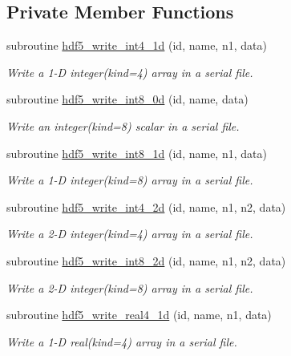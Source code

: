 \subsection*{Private Member Functions}
\begin{DoxyCompactItemize}
\item 
subroutine \hyperlink{classmodhdf5_a85487dfda18b03bd8b48100b016240b3}{hdf5\-\_\-write\-\_\-int4\-\_\-1d} (id, name, n1, data)
\begin{DoxyCompactList}\small\item\em Write a 1-\/\-D integer(kind=4) array in a serial file. \end{DoxyCompactList}\item 
subroutine \hyperlink{classmodhdf5_ac1a8b8e5ce7ef658ba72dab5853a855a}{hdf5\-\_\-write\-\_\-int8\-\_\-0d} (id, name, data)
\begin{DoxyCompactList}\small\item\em Write an integer(kind=8) scalar in a serial file. \end{DoxyCompactList}\item 
subroutine \hyperlink{classmodhdf5_af39615b3539b84afc3890884aafec217}{hdf5\-\_\-write\-\_\-int8\-\_\-1d} (id, name, n1, data)
\begin{DoxyCompactList}\small\item\em Write a 1-\/\-D integer(kind=8) array in a serial file. \end{DoxyCompactList}\item 
subroutine \hyperlink{classmodhdf5_ab39fa5690f5f029a8beea46dd8030b1d}{hdf5\-\_\-write\-\_\-int4\-\_\-2d} (id, name, n1, n2, data)
\begin{DoxyCompactList}\small\item\em Write a 2-\/\-D integer(kind=4) array in a serial file. \end{DoxyCompactList}\item 
subroutine \hyperlink{classmodhdf5_abcc24e701a795a92f16c6d4c1eb034c7}{hdf5\-\_\-write\-\_\-int8\-\_\-2d} (id, name, n1, n2, data)
\begin{DoxyCompactList}\small\item\em Write a 2-\/\-D integer(kind=8) array in a serial file. \end{DoxyCompactList}\item 
subroutine \hyperlink{classmodhdf5_a5f075a274076e480eee835fd3b9573af}{hdf5\-\_\-write\-\_\-real4\-\_\-1d} (id, name, n1, data)
\begin{DoxyCompactList}\small\item\em Write a 1-\/\-D real(kind=4) array in a serial file. \end{DoxyCompactList}\item 

\end{DoxyCompactItemize}
